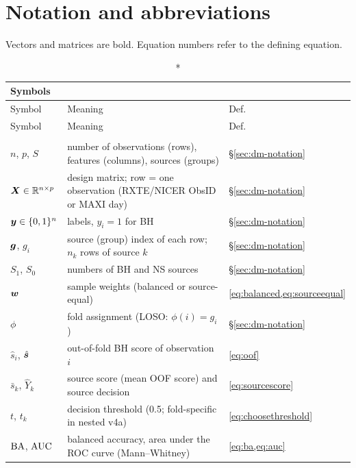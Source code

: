 \chapter*{Notation and abbreviations}
Vectors and matrices are bold. Equation numbers refer to the defining equation.

{\small\setlength{\tabcolsep}{4pt}
\begin{longtable}{@{}p{2.4cm}>{\raggedright\arraybackslash}p{9.0cm}>{\raggedleft\arraybackslash}p{2.3cm}@{}}
\caption*{\textbf{Symbols}}\\
\toprule
Symbol & Meaning & Def. \\
\midrule\endfirsthead
\toprule Symbol & Meaning & Def. \\ \midrule\endhead
\bottomrule\endfoot
\multicolumn{3}{@{}l}{\emph{Data and evaluation}}\\
$n$, $p$, $S$ & number of observations (rows), features (columns), sources (groups) & \S\ref{sec:dm-notation} \\
$\bm{X}\in\mathbb{R}^{n\times p}$ & design matrix; row = one observation (RXTE/NICER ObsID or MAXI day) & \S\ref{sec:dm-notation} \\
$\bm{y}\in\{0,1\}^n$ & labels, $y_i=1$ for BH & \S\ref{sec:dm-notation} \\
$\bm{g}$, $g_i$ & source (group) index of each row; $n_k$ rows of source $k$ & \S\ref{sec:dm-notation} \\
$S_1$, $S_0$ & numbers of BH and NS sources & \S\ref{sec:dm-notation} \\
$\bm{w}$ & sample weights (balanced or source-equal) & \cref{eq:balanced,eq:sourceequal} \\
$\phi$ & fold assignment (LOSO: $\phi(i)=g_i$) & \S\ref{sec:dm-notation} \\
$\hat s_i$, $\hat{\bm{s}}$ & out-of-fold BH score of observation $i$ & \cref{eq:oof} \\
$\bar s_k$, $\hat Y_k$ & source score (mean OOF score) and source decision & \cref{eq:sourcescore} \\
$t$, $t_k$ & decision threshold (0.5; fold-specific in nested v4a) & \cref{eq:choosethreshold} \\
$\operatorname{BA}$, $\operatorname{AUC}$ & balanced accuracy, area under the ROC curve (Mann--Whitney) & \cref{eq:ba,eq:auc} \\

\end{longtable}}
